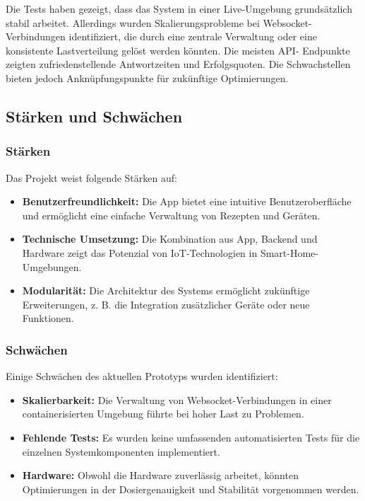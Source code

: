 
Die Tests haben gezeigt, dass das System in einer Live-Umgebung grundsätzlich stabil arbeitet. 
Allerdings wurden Skalierungsprobleme bei Websocket-Verbindungen identifiziert, die durch eine 
zentrale Verwaltung oder eine konsistente Lastverteilung gelöst werden könnten. Die meisten API-
Endpunkte zeigten zufriedenstellende Antwortzeiten und Erfolgsquoten. Die Schwachstellen bieten 
jedoch Anknüpfungspunkte für zukünftige Optimierungen.

\subsection{Stärken und Schwächen}

\subsubsection*{Stärken}

Das Projekt weist folgende Stärken auf:
\begin{itemize}
  \item \textbf{Benutzerfreundlichkeit:} Die App bietet eine intuitive Benutzeroberfläche und ermöglicht eine einfache Verwaltung von Rezepten und Geräten.
  \item \textbf{Technische Umsetzung:} Die Kombination aus App, Backend und Hardware zeigt das Potenzial von IoT-Technologien in Smart-Home-Umgebungen.
  \item \textbf{Modularität:} Die Architektur des Systems ermöglicht zukünftige Erweiterungen, z. B. die Integration zusätzlicher Geräte oder neue Funktionen.
\end{itemize}

\subsubsection*{Schwächen}

Einige Schwächen des aktuellen Prototyps wurden identifiziert:
\begin{itemize}
  \item \textbf{Skalierbarkeit:} Die Verwaltung von Websocket-Verbindungen in einer containerisierten Umgebung führte bei hoher Last zu Problemen.
  \item \textbf{Fehlende Tests:} Es wurden keine umfassenden automatisierten Tests für die einzelnen Systemkomponenten implementiert.
  \item \textbf{Hardware:} Obwohl die Hardware zuverlässig arbeitet, könnten Optimierungen in der Dosiergenauigkeit und Stabilität vorgenommen werden.
\end{itemize}


